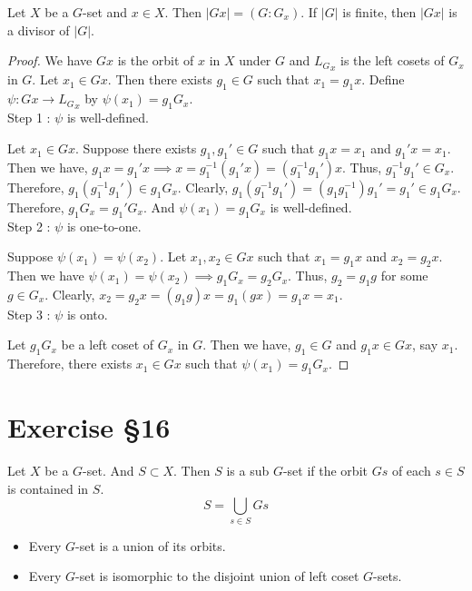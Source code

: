 \begin{theorem}
	Let $X$ be a $G$-set and $x \in X$.
	Then $|Gx| = (G:G_x)$.
	If $|G|$ is finite, then $|Gx|$ is a divisor of $|G|$.
\end{theorem}
\begin{proof}
	We have $Gx$ is the orbit of $x$ in $X$ under $G$ and ${L_G}_x$ is the left cosets of $G_x$ in $G$.
	Let $x_1 \in Gx$.
	Then there exists $g_1 \in G$ such that $x_1 = g_1x$.
	Define $\psi : Gx \to {L_G}_x$ by $\psi(x_1) = g_1G_x$.\\
	Step 1 : $\psi$ is well-defined.

	Let $x_1 \in Gx$. Suppose there exists $g_1,g_1' \in G$ such that $g_1x = x_1$ and $g_1'x = x_1$.
	Then we have, $g_1x = g_1'x \implies x = g_1^{-1}(g_1'x) = (g_1^{-1}g_1')x$.
	Thus, $g_1^{-1}g_1' \in G_x$.
	Therefore, $g_1(g_1^{-1}g_1') \in g_1G_x$.
	Clearly, $g_1(g_1^{-1}g_1') = (g_1g_1^{-1})g_1' = g_1' \in g_1G_x$.
	Therefore, $g_1G_x = g_1'G_x$.
	And $\psi(x_1) = g_1G_x$ is well-defined.\\
	Step 2 : $\psi$ is one-to-one.

	Suppose $\psi(x_1) = \psi(x_2)$.
	Let $x_1, x_2 \in Gx$ such that $x_1 = g_1x$ and $x_2 = g_2x$.
	Then we have $\psi(x_1) = \psi(x_2) \implies g_1G_x = g_2G_x$.
	Thus, $g_2 = g_1g$ for some $g \in G_x$.
	Clearly, $x_2 = g_2x = (g_1g)x = g_1(gx) = g_1x = x_1$.	\\
	Step 3 : $\psi$ is onto.

	Let $g_1G_x$ be a left coset of $G_x$ in $G$.
	Then we have, $g_1 \in G$ and $g_1x \in Gx$, say $x_1$.
	Therefore, there exists $x_1 \in Gx$ such that $\psi(x_1) = g_1G_x$.
\end{proof}


\section{Exercise \S16}
\begin{definition}
	Let $X$ be a $G$-set.
	And $S \subset X$.
	Then $S$ is a sub $G$-set if the orbit $Gs$ of each $s \in S$ is contained in $S$.
	\begin{equation}
		S = \bigcup_{s \in S} Gs
	\end{equation}
\end{definition}

\begin{remark}
	\begin{itemize}
		\item Every $G$-set is a union of its orbits.
		\item Every $G$-set is isomorphic to the disjoint union of left coset $G$-sets.
	\end{itemize}
\end{remark}

